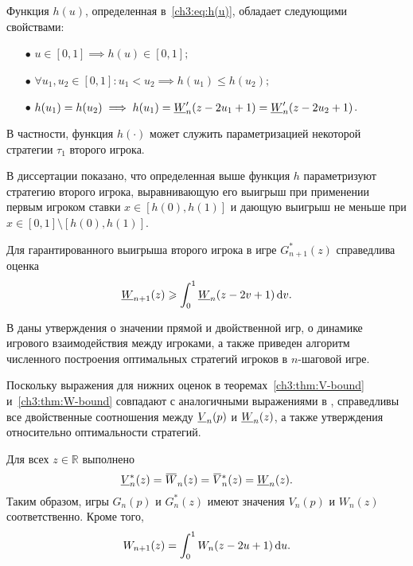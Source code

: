 \begin{lemma}\label{ch3:lem:h(u)-props}
  Функция $h(u)$, определенная в~\eqref{ch3:eq:h(u)}, обладает следующими свойствами:
  \begin{itemize}
  \item[$\bullet$] 
  $u \in [0, 1] \implies h(u) \in [0, 1];$
  \item[$\bullet$] 
  $\forall u_1, u_2 \in [0, 1]: u_1 < u_2 \implies h(u_1) \leq h(u_2);$
  \item[$\bullet$] 
  $h(u_1) = h(u_2) \implies h(u_1) = \LW[\prime]{n}(z - 2u_1 + 1) = \LW[\prime]{n}(z - 2u_2 + 1)$.
  \end{itemize}
  В частности, функция $h(\cdot)$ может служить параметризацией некоторой стратегии $\tau_1$ второго игрока.
\end{lemma}

В диссертации показано, что определенная выше функция $h$ параметризуют стратегию второго игрока, выравнивающую его выигрыш при применении первым игроком ставки $x \in [h(0), h(1)]$ и дающую выигрыш не меньше при $x \in [0, 1] \setminus [h(0), h(1)]$.

\begin{theorem}\label{ch3:thm:W-bound}
  Для гарантированного выигрыша второго игрока в игре $G_{n+1}^*(z)$ справедлива оценка
  \begin{equation*}
    \LW{n+1}(z) \geqslant \int_0^1 \LW{n}(z - 2v + 1) \di v.
  \end{equation*}
\end{theorem}

В  даны утверждения о значении прямой и двойственной игр, о динамике игрового взаимодействия между игроками, а также приведен алгоритм численного построения оптимальных стратегий игроков в $n$-шаговой игре.

Поскольку выражения для нижних оценок в теоремах~\ref{ch3:thm:V-bound} и~\ref{ch3:thm:W-bound} совпадают с аналогичными выражениями в \cite{demeyer02}, справедливы все двойственные соотношения между $\LV{n}(p)$ и $\LW{n}(z)$, а также утверждения относительно оптимальности стратегий.

\begin{theorem}
  Для всех $z \in \mathbb{R}$ выполнено
  \begin{equation}\label{ch3:eq:duality-relationships}
    \LV[*]{n}(z) = \HW{n}(z) = \HV[*]{n}(z) = \LW{n}(z).
  \end{equation}
  Таким образом, игры $G_n(p)$ и $G_n^*(z)$ имеют значения $V_n(p)$ и $W_n(z)$ соответственно.
  Кроме того,
  \begin{equation}\label{ch3:eq:W-recursive}
    W_{n+1}(z) = \int_0^1 W_n(z - 2u + 1) \mathop{}\!\mathrm{d} u.
  \end{equation}
\end{theorem}

